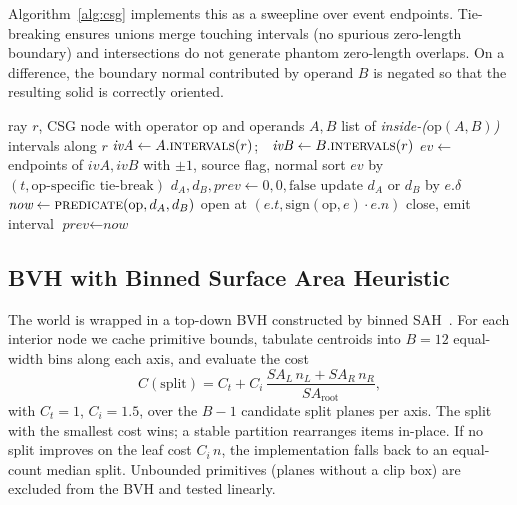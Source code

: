\documentclass[twocolumn,10pt,cleanhead,cleanfoot]{asme2e}
\begin{document}
Algorithm~\ref{alg:csg} implements this as a sweepline over event endpoints. Tie-breaking ensures unions merge touching intervals (no spurious zero-length boundary) and intersections do not generate phantom zero-length overlaps. On a difference, the boundary normal contributed by operand $B$ is negated so that the resulting solid is correctly oriented.

\begin{algorithm}[t]
\caption{CSG ray-interval evaluation.}
\label{alg:csg}
\begin{algorithmic}[1]
\Require ray $r$, CSG node with operator op and operands $A,B$
\Ensure list of \emph{inside-($\mathrm{op}(A,B)$)} intervals along $r$
\State $\mathit{ivA}\gets A.\textsc{intervals}(r)$;\ \ $\mathit{ivB}\gets B.\textsc{intervals}(r)$
\State $\mathit{ev} \gets$ endpoints of $\mathit{ivA},\mathit{ivB}$ with $\pm 1$, source flag, normal
\State sort $\mathit{ev}$ by $(t,\text{op-specific tie-break})$
\State $d_A,d_B,\textit{prev}\gets 0,0,\mathrm{false}$
\State update $d_A$ or $d_B$ by $e.\delta$
\State $\textit{now}\gets\textsc{predicate}(\text{op}, d_A, d_B)$
 open at $(e.t, \mathrm{sign}(\text{op},e)\cdot e.n)$ \EndIf
{} close, emit interval \EndIf
\State $\textit{prev}\gets\textit{now}$
\EndFor
\end{algorithmic}
\end{algorithm}

\subsection*{BVH with Binned Surface Area Heuristic}
The world is wrapped in a top-down BVH constructed by binned SAH~\cite{wald2007bvh}. For each interior node we cache primitive bounds, tabulate centroids into $B=12$ equal-width bins along each axis, and evaluate the cost
\begin{equation}
C(\text{split}) = C_t + C_i\,\frac{SA_L\,n_L + SA_R\,n_R}{SA_{\mathrm{root}}},
\label{eq:sah}
\end{equation}
with $C_t=1$, $C_i=1.5$, over the $B-1$ candidate split planes per axis. The split with the smallest cost wins; a stable partition rearranges items in-place. If no split improves on the leaf cost $C_i\,n$, the implementation falls back to an equal-count median split. Unbounded primitives (planes without a clip box) are excluded from the BVH and tested linearly.

\end{document}

